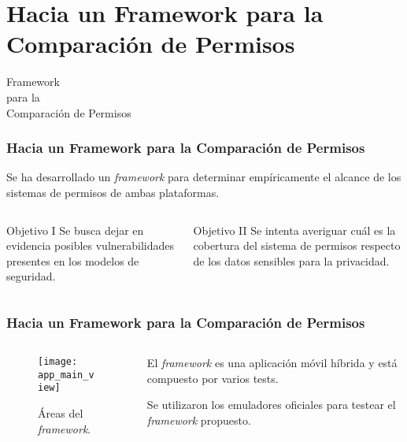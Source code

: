 \section{Hacia un Framework para la Comparación de Permisos}
\begin{frame}
 \begin{center}
  \LARGE Framework \\para la \\Comparación de Permisos
 \end{center}
\end{frame}
\begin{frame}
 \frametitle{Hacia un Framework para la Comparación de Permisos}
 \begin{block}{}
Se ha desarrollado un \textit{framework} para determinar empíricamente el alcance de los sistemas de permisos de ambas plataformas.
 \end{block}\pause
 \begin{columns}
  \begin{column}[]{.45\textwidth}
   \begin{exampleblock}{Objetivo I}
    {Se busca dejar en evidencia posibles vulnerabilidades presentes en los modelos de seguridad.}
   \end{exampleblock}
  \end{column}
  \begin{column}[]{.53\textwidth}\pause
   \begin{exampleblock}{Objetivo II}
    {Se intenta averiguar cuál es la cobertura del sistema de permisos respecto de los datos sensibles para la privacidad.}
   \end{exampleblock}
  \end{column}
 \end{columns}
\end{frame}
\begin{frame}
 \frametitle{Hacia un Framework para la Comparación de Permisos}
 \begin{columns}
  \begin{column}[]{.4\textwidth}
    \begin{figure}[hbtp]
     \centering
	 \texttt{[image: app\_main\_view]}
	 \caption{Áreas del \textit{framework}.}
	 \label{fig:chapter05:main_view}
    \end{figure}
  \end{column}
  \begin{column}[]{.58\textwidth}
  \begin{block}{}
El \textit{framework} es \alert{una aplicación móvil híbrida} \pause {} \pause y está compuesto por varios tests.
   \end{block}\pause
   \begin{block}{}
Se utilizaron los emuladores oficiales para testear el \emph{framework} propuesto.
    \end{block}
  \end{column}
 \end{columns}
\end{frame}

